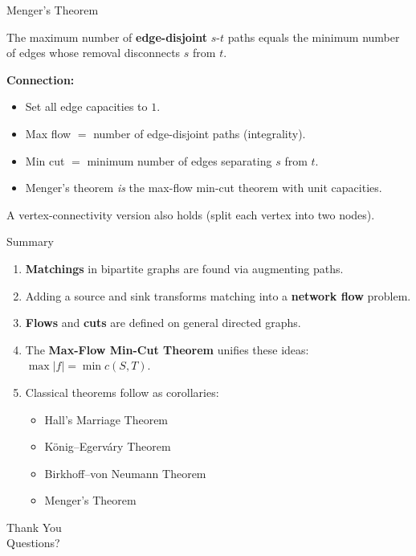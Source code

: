 \documentclass[aspectratio=169]{beamer}
\begin{document}
\begin{frame}{Menger's Theorem}
  \begin{theorem}[Menger, 1927]
    The maximum number of \textbf{edge-disjoint} $s$-$t$ paths equals the
    minimum number of edges whose removal disconnects $s$ from $t$.
  \end{theorem}

  \vspace{0.5em}
  \textbf{Connection:}
  \begin{itemize}
    \item Set all edge capacities to $1$.
    \item Max flow $=$ number of edge-disjoint paths (integrality).
    \item Min cut $=$ minimum number of edges separating $s$ from $t$.
    \item Menger's theorem \emph{is} the max-flow min-cut theorem with unit
          capacities.
  \end{itemize}

  \vspace{0.5em}
  A vertex-connectivity version also holds (split each vertex into two nodes).
\end{frame}

\begin{frame}{Summary}
  \begin{enumerate}
    \item \textbf{Matchings} in bipartite graphs are found via augmenting paths.
    \item Adding a source and sink transforms matching into a \textbf{network flow}
          problem.
    \item \textbf{Flows} and \textbf{cuts} are defined on general directed graphs.
    \item The \textbf{Max-Flow Min-Cut Theorem} unifies these ideas:
          $\max |f| = \min c(S,T)$.
    \item Classical theorems follow as corollaries:
          \begin{itemize}
            \item Hall's Marriage Theorem
            \item K\"{o}nig--Egerv\'{a}ry Theorem
            \item Birkhoff--von Neumann Theorem
            \item Menger's Theorem
          \end{itemize}
  \end{enumerate}
\end{frame}

\begin{frame}{}
  \centering
  \Huge Thank You \\[1em]
  \large Questions?
\end{frame}
\end{document}
